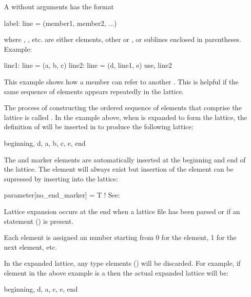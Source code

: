 A  without arguments has the format
\begin{example}
  label: line = (member1, member2, ...)
\end{example}
where , , etc. are either elements, other  or , or sublines enclosed in parentheses.
Example:
\begin{example}
  line1: line = (a, b, c)
  line2: line = (d, line1, e)
  use, line2
\end{example}
This example shows how a  member can refer to another
. This is helpful if the same sequence of elements
appears repeatedly in the lattice. 

The process of constructing the ordered sequence of elements that
comprise the lattice is called . In the example
above, when  is expanded to form the lattice, the definition
of  will be inserted in to produce the following lattice:
\begin{example}
  beginning, d, a, b, c, e, end
\end{example}
The  and  marker elements are automatically inserted
at the beginning and end of the lattice. The  element will
always exist but insertion of the  element can be supressed by inserting
into the lattice:
\begin{example}
 parameter[no_end_marker] = T    ! See: 
\end{example}
Lattice expansion occurs at the end when a lattice file has been
parsed or if an  statement () is
present.

Each element is assigned an  number starting from 0
for the  element, 1 for the next element, etc.

In the expanded lattice, any  type elements
() will be discarded. For example, if element 
in the above example is a  then the actual expanded
lattice will be:
\begin{example}
  beginning, d, a, c, e, end
\end{example}


